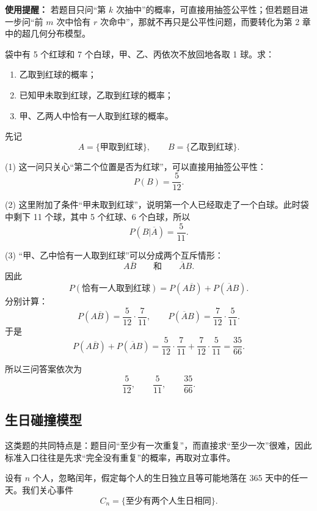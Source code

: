 ﻿\documentclass[lang=cn,11pt]{elegantbook}
\begin{document}
\begin{note}
\textbf{使用提醒：} 若题目只问“第 \(k\) 次抽中”的概率，可直接用抽签公平性；但若题目进一步问“前 \(m\) 次中恰有 \(r\) 次命中”，那就不再只是公平性问题，而要转化为第 2 章中的超几何分布模型。
\end{note}

\begin{exercise}[抽签公平与不放回抽样]\label{ex:classic_lots}
袋中有 5 个红球和 7 个白球，甲、乙、丙依次不放回地各取 1 球。求：
\begin{enumerate}
    \item 乙取到红球的概率；
    \item 已知甲未取到红球，乙取到红球的概率；
    \item 甲、乙两人中恰有一人取到红球的概率。
\end{enumerate}
\end{exercise}

\begin{solution}
先记
\[
A=\{\text{甲取到红球}\},\qquad B=\{\text{乙取到红球}\}.
\]

(1) 这一问只关心“第二个位置是否为红球”，可以直接用抽签公平性：
\[
P(B)=\frac{5}{12}.
\]

(2) 这里附加了条件“甲未取到红球”，说明第一个人已经取走了一个白球。此时袋中剩下 11 个球，其中 5 个红球、6 个白球，所以
\[
P(B|\overline A)=\frac{5}{11}.
\]

(3) “甲、乙中恰有一人取到红球”可以分成两个互斥情形：
\[
A\overline B\qquad\text{和}\qquad \overline A B.
\]
因此
\[
P(\text{恰有一人取到红球})=P(A\overline B)+P(\overline A B).
\]
分别计算：
\[
P(A\overline B)=\frac{5}{12}\cdot\frac{7}{11},\qquad
P(\overline A B)=\frac{7}{12}\cdot\frac{5}{11}.
\]
于是
\[
P(A\overline B)+P(\overline A B)
=\frac{5}{12}\cdot\frac{7}{11}+\frac{7}{12}\cdot\frac{5}{11}
=\frac{35}{66}.
\]

所以三问答案依次为
\[
\frac{5}{12},\qquad \frac{5}{11},\qquad \frac{35}{66}.
\]
\end{solution}

\subsection{生日碰撞模型}

这类题的共同特点是：题目问“至少有一次重复”，而直接求“至少一次”很难，因此标准入口往往是先求“完全没有重复”的概率，再取对立事件。

\begin{definition}[生日碰撞模型]\label{def:birthday-model}
设有 \(n\) 个人，忽略闰年，假定每个人的生日独立且等可能地落在 365 天中的任一天。我们关心事件
\[
C_n=\{\text{至少有两个人生日相同}\}.
\]
\end{definition}
\end{document}
